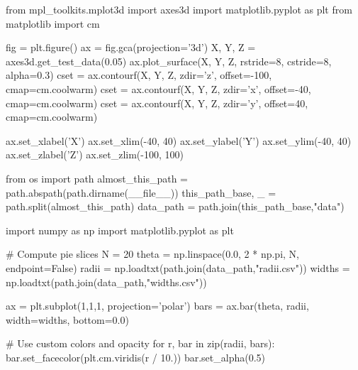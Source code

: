 \begin{pycode}[3dplot]
from mpl_toolkits.mplot3d import axes3d
import matplotlib.pyplot as plt
from matplotlib import cm

fig = plt.figure()
ax = fig.gca(projection='3d')
X, Y, Z = axes3d.get_test_data(0.05)
ax.plot_surface(X, Y, Z, rstride=8, cstride=8, alpha=0.3)
cset = ax.contourf(X, Y, Z, zdir='z', offset=-100, cmap=cm.coolwarm)
cset = ax.contourf(X, Y, Z, zdir='x', offset=-40, cmap=cm.coolwarm)
cset = ax.contourf(X, Y, Z, zdir='y', offset=40, cmap=cm.coolwarm)

ax.set_xlabel('X')
ax.set_xlim(-40, 40)
ax.set_ylabel('Y')
ax.set_ylim(-40, 40)
ax.set_zlabel('Z')
ax.set_zlim(-100, 100)
\end{pycode}
\begin{pycode}[radar]
from os import path
almost_this_path = path.abspath(path.dirname(__file__))
this_path_base, _ = path.split(almost_this_path)
data_path = path.join(this_path_base,"data")
    
import numpy as np
import matplotlib.pyplot as plt


# Compute pie slices
N = 20
theta = np.linspace(0.0, 2 * np.pi, N, endpoint=False)
radii = np.loadtxt(path.join(data_path,"radii.csv"))
widths = np.loadtxt(path.join(data_path,"widths.csv"))

ax = plt.subplot(1,1,1, projection='polar')
bars = ax.bar(theta, radii, width=widths, bottom=0.0)

# Use custom colors and opacity
for r, bar in zip(radii, bars):
    bar.set_facecolor(plt.cm.viridis(r / 10.))
    bar.set_alpha(0.5)
\end{pycode}
